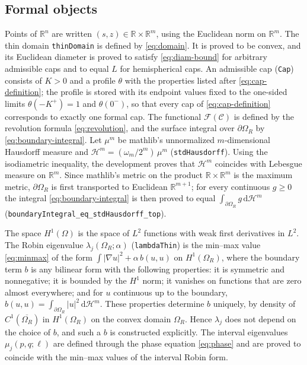 \documentclass[11pt,a4paper]{article}
\numberwithin{equation}{section}
\theoremstyle{paperplain}
\theoremstyle{remark}
\newcommand{\R}{\mathbb{R}}
\newcommand{\C}{\mathcal{C}}
\newcommand{\HH}{\mathcal{H}}
\newcommand{\dd}{\,\mathrm d}
\newcommand{\lean}[1]{\texttt{#1}}
\begin{document}
\subsection{Formal objects}\label{sec:formal-objects}
Points of $\R^n$ are written $(s,z)\in\R\times\R^m$, using the Euclidean
norm on $\R^m$. The thin domain \lean{thinDomain} is defined by
\eqref{eq:domain}. It is proved to be convex, and its Euclidean diameter is
proved to satisfy \eqref{eq:diam-bound} for arbitrary admissible caps and to
equal $L$ for hemispherical caps. An admissible cap (\lean{Cap}) consists of
$K>0$ and a profile $\theta$ with the properties listed after
\eqref{eq:cap-definition}; the profile is stored with its endpoint values
fixed to the one-sided limits $\theta(-K^+)=1$ and $\theta(0^-)$, so that
every cap of \eqref{eq:cap-definition} corresponds to exactly one formal
cap. The functional $\mathcal F(\C)$ is defined by the
revolution formula \eqref{eq:revolution}, and the surface integral over
$\partial\Omega_R$ by \eqref{eq:boundary-integral}. Let $\mu^m$ be
mathlib's unnormalized $m$-dimensional Hausdorff measure and
$\HH^m=(\omega_m/2^m)\,\mu^m$ (\lean{stdHausdorff}). Using the isodiametric
inequality, the development proves that $\HH^m$ coincides with Lebesgue
measure on $\R^m$. Since mathlib's metric on the product $\R\times\R^m$ is
the maximum metric, $\partial\Omega_R$ is first transported to Euclidean
$\R^{m+1}$; for every continuous $g\ge0$ the integral
\eqref{eq:boundary-integral} is then proved to equal
$\int_{\partial\Omega_R}g\dd\HH^m$
(\lean{boundaryIntegral\_eq\_stdHausdorff\_top}).

The space $H^1(\Omega)$ is the space of $L^2$ functions with weak first
derivatives in $L^2$. The Robin eigenvalue $\lambda_j(\Omega_R;\alpha)$
(\lean{lambdaThin}) is the min--max value \eqref{eq:minmax} of the form
$\int|\nabla u|^2+\alpha\,b(u,u)$ on $H^1(\Omega_R)$, where the boundary
term $b$ is any bilinear form with the following properties: it is
symmetric and nonnegative; it is bounded by the $H^1$ norm; it vanishes on
functions that are zero almost everywhere; and for $u$ continuous up to the
boundary, $b(u,u)=\int_{\partial\Omega_R}|u|^2\dd\HH^{m}$. These properties
determine $b$ uniquely, by density of $C^1(\overline{\Omega_R})$ in
$H^1(\Omega_R)$ on the convex domain $\Omega_R$. Hence $\lambda_j$ does not
depend on the choice of $b$, and such a $b$ is constructed explicitly. The
interval eigenvalues $\mu_j(p,q;\ell)$ are defined through the phase
equation \eqref{eq:phase} and are proved to coincide with the min--max values
of the interval Robin form.
\end{document}
